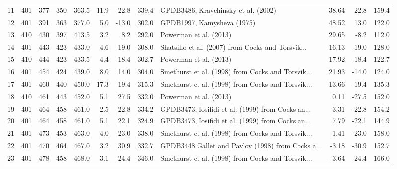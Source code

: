 \documentclass[11pt]{article}
\begin{document}
\begin{sidewaystable}
{\begin{tabular}{lrrrrrrrlrrr}
11 &       401 &       377 &      350 &       363.5 &  11.9 & -22.8 &  339.4 &                GPDB3486, Kravchinsky et al. (2002) &     38.64 &    22.8 &   159.4 \\
12 &       401 &       391 &      363 &       377.0 &   5.0 & -13.0 &  302.0 &                         GPDB1997, Kamysheva (1975) &     48.52 &    13.0 &   122.0 \\
13 &       410 &       430 &      397 &       413.5 &   3.2 &   8.2 &  292.0 &                             Powerman et al. (2013) &     29.65 &    -8.2 &   112.0 \\
14 &       401 &       443 &      423 &       433.0 &   4.6 &  19.0 &  308.0 &  Shatsillo et al. (2007) from Cocks and Torsvik... &     16.13 &   -19.0 &   128.0 \\
15 &       410 &       444 &      423 &       433.5 &   4.4 &  18.4 &  302.7 &                             Powerman et al. (2013) &     17.92 &   -18.4 &   122.7 \\
16 &       401 &       454 &      424 &       439.0 &   8.0 &  14.0 &  304.0 &  Smethurst et al. (1998) from Cocks and Torsvik... &     21.93 &   -14.0 &   124.0 \\
17 &       401 &       460 &      440 &       450.0 &  17.3 &  19.4 &  315.3 &  Smethurst et al. (1998) from Cocks and Torsvik... &     13.66 &   -19.4 &   135.3 \\
18 &       410 &       461 &      443 &       452.0 &   5.1 &  27.5 &  332.0 &                             Powerman et al. (2013) &      0.11 &   -27.5 &   152.0 \\
19 &       401 &       464 &      458 &       461.0 &   2.5 &  22.8 &  334.2 &  GPDB3473, Iosifidi et al. (1999) from Cocks an... &      3.31 &   -22.8 &   154.2 \\
20 &       401 &       464 &      458 &       461.0 &   5.1 &  22.1 &  324.9 &  GPDB3473, Iosifidi et al. (1999) from Cocks an... &      7.79 &   -22.1 &   144.9 \\
21 &       401 &       473 &      453 &       463.0 &   4.0 &  23.0 &  338.0 &  Smethurst et al. (1998) from Cocks and Torsvik... &      1.41 &   -23.0 &   158.0 \\
22 &       401 &       470 &      464 &       467.0 &   3.2 &  30.9 &  332.7 &  GPDB3448 Gallet and Pavlov (1998) from Cocks a... &     -3.18 &   -30.9 &   152.7 \\
23 &       401 &       478 &      458 &       468.0 &   3.1 &  24.4 &  346.0 &  Smethurst et al. (1998) from Cocks and Torsvik... &     -3.64 &   -24.4 &   166.0 \\

\end{tabular}}
\end{sidewaystable}
\end{document}
